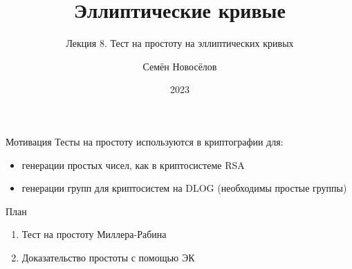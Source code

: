 \documentclass{beamer}
\title{Эллиптические кривые}
\subtitle{Лекция 8. Тест на простоту на эллиптических кривых}
\author{Семён Новосёлов}
\institute{БФУ им. И. Канта}
\date{2023}
\begin{document}
\frame{\titlepage}

\begin{frame}{Мотивация}
	Тесты на простоту используются в криптографии для:
	\vspace{0.5em}
	\begin{itemize}
	    \item генерации простых чисел, как в криптосистеме RSA
	    \item генерации групп для криптосистем на DLOG (необходимы простые группы)
	\end{itemize}
\end{frame}

\begin{frame}{План}
	\begin{enumerate}
		\item Тест на простоту Миллера-Рабина
		\item Доказательство простоты с помощью ЭК
	\end{enumerate}
\end{frame}
\end{document}
